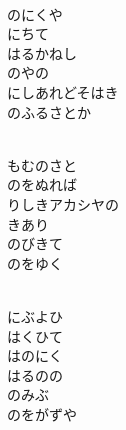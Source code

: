 \documentclass[10pt,b5j]{tarticle} %
\begin{document}
\vspace{1.5em} %
\newcommand{\linespace}{0.5em} %
\newcommand{\blocksize}{0.5\hsize} %
\newcommand{\itemmargin}{3em} %
\begin{enumerate} %
    \setlength{\itemindent}{\itemmargin} %
    \begin{minipage}[c]{\blocksize}
    
        \vspace{\linespace}
        \item~\\
        のにくや\\
        にちて\\
        はるかねし\\
        のやの\\
        にしあれどそはき\\
        のふるさとか
        
    \end{minipage}
    \begin{minipage}[c]{\blocksize}
        
        \vspace{\linespace}
        \item~\\
        もむのさと\\
        のをぬれば\\
        りしきアカシヤの\\
        きあり\\
        のびきて\\
        のをゆく
        
    \end{minipage}
    \begin{minipage}[c]{\blocksize}
        
        \vspace{\linespace}
        \item~\\
        にぶよひ\\
        はくひて\\
        はのにく\\
        はるのの\\
        のみぶ\\
        のをがずや
        

\end{minipage}
\end{enumerate}
\end{document}
